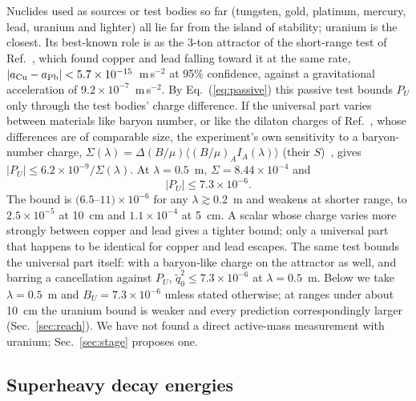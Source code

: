 \documentclass[aps,prd,onecolumn,superscriptaddress,floatfix,nofootinbib]{revtex4-2}
\newcommand{\qt}{\tilde q}
\begin{document}
Nuclides used as sources or test bodies so far (tungsten, gold, platinum, mercury, lead, uranium and lighter)
all lie far from the island of stability; uranium is the closest. Its best-known role is as the 3-ton
attractor of the short-range test of Ref.~\cite{Smith2000}, which found copper and lead falling toward it at the
same rate, $|a_{\rm Cu}-a_{\rm Pb}|<5.7\times10^{-15}$~m\,s$^{-2}$ at 95\% confidence, against a gravitational
acceleration of $9.2\times10^{-7}$~m\,s$^{-2}$. By Eq.~(\ref{eq:passive}) this passive test bounds $P_U$ only
through the test bodies' charge difference. If the universal part varies between materials like baryon number, or
like the dilaton charges of Ref.~\cite{Damour2010}, whose differences are of comparable size, the experiment's own
sensitivity to a baryon-number charge, $\Sigma(\lambda)=\Delta(B/\mu)\langle(B/\mu)_A I_A(\lambda)\rangle$ (their
$S$)~\cite{Smith2000}, gives $|P_U|\le6.2\times10^{-9}/\Sigma(\lambda)$. At $\lambda=0.5$~m, $\Sigma=8.44\times10^{-4}$
and
\begin{equation}
|P_U| \le 7.3\times10^{-6}.
\label{eq:BU}
\end{equation}
The bound is $(6.5$--$11)\times10^{-6}$ for any $\lambda\gtrsim0.2$~m and weakens at shorter range, to
$2.5\times10^{-5}$ at 10~cm and $1.1\times10^{-4}$ at 5~cm. A scalar whose charge varies more strongly between
copper and lead gives a tighter bound; only a universal part that happens to be identical for copper and lead
escapes. The same test bounds the universal part itself: with a baryon-like charge on the attractor as well, and
barring a cancellation against $P_U$, $\qt_0^2\le7.3\times10^{-6}$ at $\lambda=0.5$~m. Below we take
$\lambda=0.5$~m and $B_U=7.3\times10^{-6}$ unless stated otherwise; at ranges under about 10~cm the uranium bound is
weaker and every prediction correspondingly larger (Sec.~\ref{sec:reach}). We have not found a direct active-mass
measurement with uranium; Sec.~\ref{sec:stage} proposes one.

\subsection{Superheavy decay energies}\label{sec:qalpha}
\end{document}
